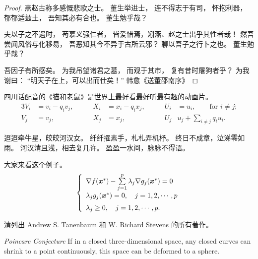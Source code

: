 \begin{proof}
燕赵古称多感慨悲歌之士。
董生举进士，
连不得志于有司，
怀抱利器，
郁郁适兹土，
吾知其必有合也。
董生勉乎哉？

夫以子之不遇时，
苟慕义强仁者，
皆爱惜焉，矧燕、赵之士出乎其性者哉！
然吾尝闻风俗与化移易，
吾恶知其今不异于古所云邪？
聊以吾子之行卜之也。
董生勉乎哉？

吾因子有所感矣。
为我吊望诸君之墓，
而观于其市，
复有昔时屠狗者乎？
为我谢曰：
“明天子在上，可以出而仕矣！”
\hfill\pozhehao 韩愈《送董邵南序》
\end{proof}

\begin{corollary}
  四川话配音的《猫和老鼠》是世界上最好看最好听最有趣的动画片。
\begin{alignat}{3}
V_i & =v_i - q_i v_j, & \qquad X_i & = x_i - q_i x_j,
 & \qquad U_i & = u_i,
 \qquad \text{for $i\ne j$;}\label{eq:B}\\
V_j & = v_j, & \qquad X_j & = x_j,
  & \qquad U_j & u_j + \sum_{i\ne j} q_i u_i.
\end{alignat}
\end{corollary}

迢迢牵牛星，皎皎河汉女。
纤纤擢素手，札札弄机杼。
终日不成章，泣涕零如雨。
河汉清且浅，相去复几许。
盈盈一水间，脉脉不得语。

\begin{example}
  大家来看这个例子。
\begin{equation}
\label{ktc}
\left\{\begin{array}{l}
\nabla f({\mbox{\boldmath $x$}}^*)-\sum\limits_{j=1}^p\lambda_j\nabla g_j({\mbox{\boldmath $x$}}^*)=0\\[0.3cm]
\lambda_jg_j({\mbox{\boldmath $x$}}^*)=0,\quad j=1,2,\cdots,p\\[0.2cm]
\lambda_j\ge 0,\quad j=1,2,\cdots,p.
\end{array}\right.
\end{equation}
\end{example}

\begin{exercise}
  清列出 Andrew S. Tanenbaum 和 W. Richard Stevens 的所有著作。
\end{exercise}

\begin{conjecture} \textit{Poincare Conjecture} If in a closed three-dimensional space,
any closed curves can shrink to a point continuously,
this space can be deformed to a sphere.
\end{conjecture}

